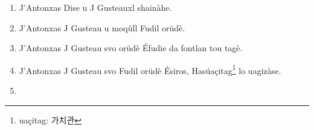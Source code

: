 \documentclass{article}
\begin{document}
\begin{enumerate}
    \item J'Antonxas Dise u J Gusteauxl shainàhe.
    \item J'Antonxas J Gusteau u moqûll Fudil orüdè.
    \item J'Antonxas J Gusteau svo orüdè Éfudie da fontlan tou tagè.
    \item J'Antonxas J Gusteau svo Fudil orüdè Ésiros, Hasúaçitag\footnote{uaçitag: 가치관} lo uagizàse.
    \item
\end{enumerate}

\end{document}
